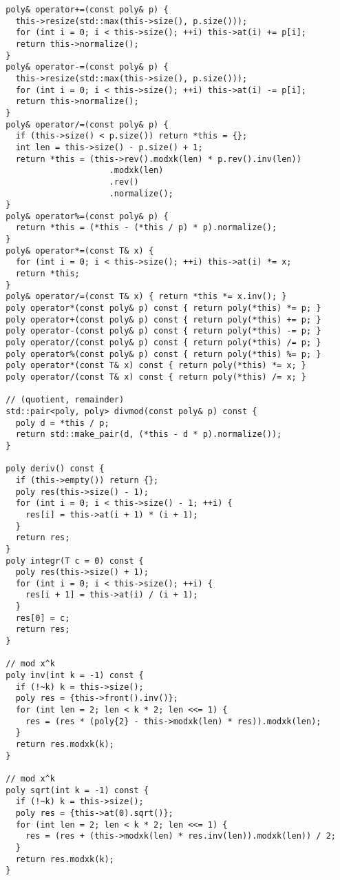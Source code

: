 \documentclass{article}
\begin{document}
\begin{lstlisting}
  poly& operator+=(const poly& p) {
    this->resize(std::max(this->size(), p.size()));
    for (int i = 0; i < this->size(); ++i) this->at(i) += p[i];
    return this->normalize();
  }
  poly& operator-=(const poly& p) {
    this->resize(std::max(this->size(), p.size()));
    for (int i = 0; i < this->size(); ++i) this->at(i) -= p[i];
    return this->normalize();
  }
  poly& operator/=(const poly& p) {
    if (this->size() < p.size()) return *this = {};
    int len = this->size() - p.size() + 1;
    return *this = (this->rev().modxk(len) * p.rev().inv(len))
                       .modxk(len)
                       .rev()
                       .normalize();
  }
  poly& operator%=(const poly& p) {
    return *this = (*this - (*this / p) * p).normalize();
  }
  poly& operator*=(const T& x) {
    for (int i = 0; i < this->size(); ++i) this->at(i) *= x;
    return *this;
  }
  poly& operator/=(const T& x) { return *this *= x.inv(); }
  poly operator*(const poly& p) const { return poly(*this) *= p; }
  poly operator+(const poly& p) const { return poly(*this) += p; }
  poly operator-(const poly& p) const { return poly(*this) -= p; }
  poly operator/(const poly& p) const { return poly(*this) /= p; }
  poly operator%(const poly& p) const { return poly(*this) %= p; }
  poly operator*(const T& x) const { return poly(*this) *= x; }
  poly operator/(const T& x) const { return poly(*this) /= x; }

  // (quotient, remainder)
  std::pair<poly, poly> divmod(const poly& p) const {
    poly d = *this / p;
    return std::make_pair(d, (*this - d * p).normalize());
  }

  poly deriv() const {
    if (this->empty()) return {};
    poly res(this->size() - 1);
    for (int i = 0; i < this->size() - 1; ++i) {
      res[i] = this->at(i + 1) * (i + 1);
    }
    return res;
  }
  poly integr(T c = 0) const {
    poly res(this->size() + 1);
    for (int i = 0; i < this->size(); ++i) {
      res[i + 1] = this->at(i) / (i + 1);
    }
    res[0] = c;
    return res;
  }

  // mod x^k
  poly inv(int k = -1) const {
    if (!~k) k = this->size();
    poly res = {this->front().inv()};
    for (int len = 2; len < k * 2; len <<= 1) {
      res = (res * (poly{2} - this->modxk(len) * res)).modxk(len);
    }
    return res.modxk(k);
  }

  // mod x^k
  poly sqrt(int k = -1) const {
    if (!~k) k = this->size();
    poly res = {this->at(0).sqrt()};
    for (int len = 2; len < k * 2; len <<= 1) {
      res = (res + (this->modxk(len) * res.inv(len)).modxk(len)) / 2;
    }
    return res.modxk(k);
  }


\end{lstlisting}
\end{document}

